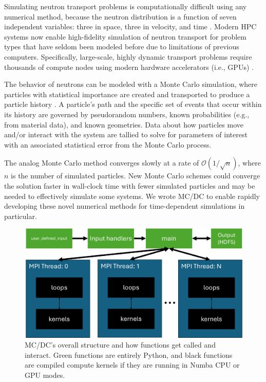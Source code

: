 Simulating neutron transport problems is computationally difficult using any numerical method, because the neutron distribution is a function of seven independent variables: three in space, three in velocity, and time \cite{lewis_computational_1984}.
Modern HPC systems now enable high-fidelity simulation of neutron transport for problem types that have seldom been modeled before due to limitations of previous computers. %
Specifically, large-scale, highly dynamic transport problems require thousands of compute nodes using modern hardware accelerators (i.e., GPUs) \cite{hamilton_continuous-energy_2019, romano_openmc_2015}.

The behavior of neutrons can be modeled with a Monte Carlo simulation, where particles with statistical importance are created and transported to produce a particle history \cite{lewis_computational_1984}.
A particle's path and the specific set of events that occur within its history are governed by pseudorandom numbers, known probabilities (e.g., from material data), and known geometries.
Data about how particles move and/or interact with the system are tallied to solve for parameters of interest with an associated statistical error from the Monte Carlo process.

The analog Monte Carlo method converges slowly at a rate of $\mathcal{O}(1/\sqrt{n})$, where $n$ is the number of simulated particles.
New Monte Carlo schemes could converge the solution faster in wall-clock time with fewer simulated particles and may be needed to effectively simulate some systems.
We wrote MC/DC to enable rapidly developing these novel numerical methods for time-dependent simulations in particular.


\begin{figure}
    \centerline{\includegraphics[width=.95\textwidth]{figures/cise_figs/flow.pdf}}
    \caption{MC/DC's overall structure and how functions get called and interact. Green functions are entirely Python, and black functions are compiled compute kernels if they are running in Numba CPU or GPU modes.}\vspace*{-5pt}
    \label{mpi_mcdc}
\end{figure}

